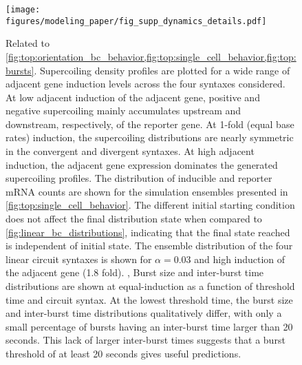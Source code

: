 \documentclass[11pt]{article} %
\begin{document}
\begin{figure}[htbp]
    \centering
    {\texttt{[image: figures/modeling\_paper/fig\_supp\_dynamics\_details.pdf]}
    \label{fig:supp:sc_density_induction}
    \label{fig:supp:fig_examples_ensemble_behavior}
    \label{fig:supp:sc_distributions_high_alpha_induction}
    \label{fig:burst_threshold_burst_size}
    \label{fig:burst_threshold_interburst_time}
    }
\end{figure}
\begin{figure}[htbp]
    \ContinuedFloat
    \caption{Related to \cref{fig:top:orientation_bc_behavior,fig:top:single_cell_behavior,fig:top:bursts}.
     Supercoiling density profiles are plotted for a wide range of adjacent gene induction levels across the four syntaxes considered. At low adjacent induction of the adjacent gene, positive and negative supercoiling mainly accumulates upstream and downstream, respectively, of the reporter gene. At 1-fold (equal base rates) induction, the supercoiling distributions are nearly symmetric in the convergent and divergent syntaxes. At high adjacent induction, the adjacent gene expression dominates the generated supercoiling profiles.
     The distribution of inducible and reporter mRNA counts are shown for the simulation ensembles presented in \cref{fig:top:single_cell_behavior}. The different initial starting condition does not affect the final distribution state when compared to \cref{fig:linear_bc_distributions}, indicating that the final state reached is independent of initial state.
    The ensemble distribution of the four linear circuit syntaxes is shown for \(\alpha = 0.03\) and high induction of the adjacent gene (1.8 fold).
    , Burst size and inter-burst time distributions are shown at equal-induction as a function of threshold time and circuit syntax. At the lowest threshold time, the burst size and inter-burst time distributions qualitatively differ, with only a small percentage of bursts having an inter-burst time larger than 20 seconds. This lack of larger inter-burst times suggests that a burst threshold of at least 20 seconds gives useful predictions.
    }
    \label{fig:top:supp_dynamics_details}
\end{figure}
\end{document}
